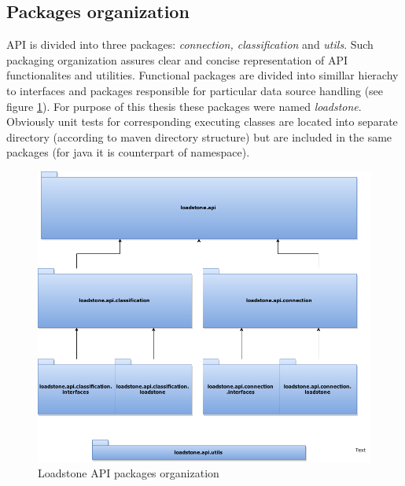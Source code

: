 \subsection{Packages organization}
API is divided into three packages: \textit{connection, classification} and \textit{utils}. Such packaging organization assures clear and concise representation of API functionalites and utilities. Functional packages are divided into simillar hierachy to interfaces and packages responsible for particular data source handling (see figure \ref{fig:@=packages_oragnization}). For purpose of this thesis these packages were named \textit{loadstone}. Obviously unit tests for corresponding executing classes are located into separate directory (according to maven directory structure) \cite{20} but are included in the same packages (for java it is counterpart of namespace).
\begin{figure}[h]
 	\centering
 	\includegraphics[scale=0.5]{loadstone_api_packages.png}
 	\caption{Loadstone API packages organization}
 	\label{fig:@=packages_oragnization}
\end{figure}
